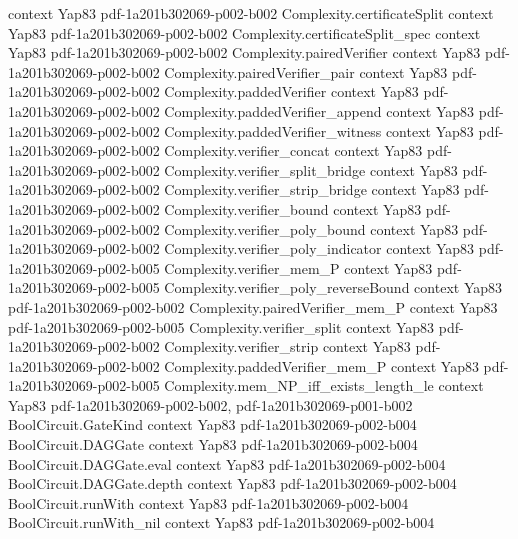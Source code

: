 \begin{theorem}
  {context}
  {Yap83}
  {pdf-1a201b302069-p002-b002}
\proofstep
  {Complexity.certificateSplit}
  {context}
  {Yap83}
  {pdf-1a201b302069-p002-b002}
\proofstep
  {Complexity.certificateSplit_spec}
  {context}
  {Yap83}
  {pdf-1a201b302069-p002-b002}
\proofstep
  {Complexity.pairedVerifier}
  {context}
  {Yap83}
  {pdf-1a201b302069-p002-b002}
\proofstep
  {Complexity.pairedVerifier_pair}
  {context}
  {Yap83}
  {pdf-1a201b302069-p002-b002}
\proofstep
  {Complexity.paddedVerifier}
  {context}
  {Yap83}
  {pdf-1a201b302069-p002-b002}
\proofstep
  {Complexity.paddedVerifier_append}
  {context}
  {Yap83}
  {pdf-1a201b302069-p002-b002}
\proofstep
  {Complexity.paddedVerifier_witness}
  {context}
  {Yap83}
  {pdf-1a201b302069-p002-b002}
\proofstep
  {Complexity.verifier_concat}
  {context}
  {Yap83}
  {pdf-1a201b302069-p002-b002}
\proofstep
  {Complexity.verifier_split_bridge}
  {context}
  {Yap83}
  {pdf-1a201b302069-p002-b002}
\proofstep
  {Complexity.verifier_strip_bridge}
  {context}
  {Yap83}
  {pdf-1a201b302069-p002-b002}
\proofstep
  {Complexity.verifier_bound}
  {context}
  {Yap83}
  {pdf-1a201b302069-p002-b002}
\proofstep
  {Complexity.verifier_poly_bound}
  {context}
  {Yap83}
  {pdf-1a201b302069-p002-b002}
\proofstep
  {Complexity.verifier_poly_indicator}
  {context}
  {Yap83}
  {pdf-1a201b302069-p002-b005}
\proofstep
  {Complexity.verifier_mem_P}
  {context}
  {Yap83}
  {pdf-1a201b302069-p002-b005}
\proofstep
  {Complexity.verifier_poly_reverseBound}
  {context}
  {Yap83}
  {pdf-1a201b302069-p002-b002}
\proofstep
  {Complexity.pairedVerifier_mem_P}
  {context}
  {Yap83}
  {pdf-1a201b302069-p002-b005}
\proofstep
  {Complexity.verifier_split}
  {context}
  {Yap83}
  {pdf-1a201b302069-p002-b002}
\proofstep
  {Complexity.verifier_strip}
  {context}
  {Yap83}
  {pdf-1a201b302069-p002-b002}
\proofstep
  {Complexity.paddedVerifier_mem_P}
  {context}
  {Yap83}
  {pdf-1a201b302069-p002-b005}
\proofstep
  {Complexity.mem_NP_iff_exists_length_le}
  {context}
  {Yap83}
  {pdf-1a201b302069-p002-b002,
    pdf-1a201b302069-p001-b002}
\proofstep
  {BoolCircuit.GateKind}
  {context}
  {Yap83}
  {pdf-1a201b302069-p002-b004}
\proofstep
  {BoolCircuit.DAGGate}
  {context}
  {Yap83}
  {pdf-1a201b302069-p002-b004}
\proofstep
  {BoolCircuit.DAGGate.eval}
  {context}
  {Yap83}
  {pdf-1a201b302069-p002-b004}
\proofstep
  {BoolCircuit.DAGGate.depth}
  {context}
  {Yap83}
  {pdf-1a201b302069-p002-b004}
\proofstep
  {BoolCircuit.runWith}
  {context}
  {Yap83}
  {pdf-1a201b302069-p002-b004}
\proofstep
  {BoolCircuit.runWith_nil}
  {context}
  {Yap83}
  {pdf-1a201b302069-p002-b004}

\end{theorem}
